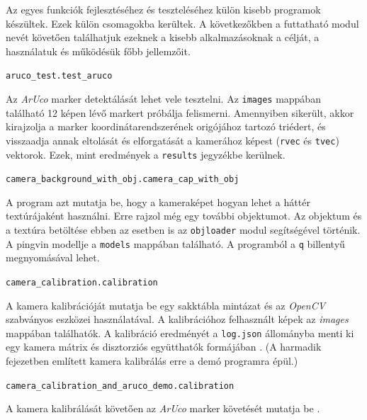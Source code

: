 

Az egyes funkciók fejlesztéséhez és teszteléséhez külön kisebb programok készültek.
Ezek külön csomagokba kerültek.
A következőkben a futtatható modul nevét követően találhatjuk ezeknek a kisebb alkalmazásoknak a célját, a használatuk és működésük főbb jellemzőit.

\bigskip

\noindent \texttt{aruco\_test.test\_aruco}

\medskip

Az \textit{ArUco} marker detektálását lehet vele tesztelni.
Az \texttt{images} mappában található 12 képen lévő markert próbálja felismerni.
Amennyiben sikerült, akkor kirajzolja a marker koordinátarendszerének origójához tartozó triédert, és visszaadja annak eltolását és elforgatását a kamerához képest (\texttt{rvec} és \texttt{tvec}) vektorok.
Ezek, mint eredmények a \texttt{results} jegyzékbe kerülnek.

\bigskip

\noindent \texttt{camera\_background\_with\_obj.camera\_cap\_with\_obj}

\medskip

A program azt mutatja be, hogy a kameraképet hogyan lehet a háttér textúrájaként használni.
Erre rajzol még egy további objektumot.
Az objektum és a textúra betöltése ebben az esetben is az \texttt{objloader} modul segítségével történik.
A pingvin modellje a \texttt{models} mappában található.
A programból a \texttt{q} billentyű megnyomásával lehet.

\bigskip

\noindent \texttt{camera\_calibration.calibration}

\medskip

A kamera kalibrációját mutatja be egy sakktábla mintázat és az \textit{OpenCV} szabványos eszközei használatával.
A kalibrációhoz felhasznált képek az \textit{images} mappában találhatók.
A kalibráció eredményét a \texttt{log.json} állományba menti ki egy kamera mátrix és disztorziós együtthatók formájában \cite{opencvcalib}.
(A harmadik fejezetben említett kamera kalibrálás erre a demó programra épül.) 

\bigskip

\noindent \texttt{camera\_calibration\_and\_aruco\_demo.calibration}

\medskip

A kamera kalibrálását követően az \textit{ArUco} marker követését mutatja be \cite{arucotracking}.

